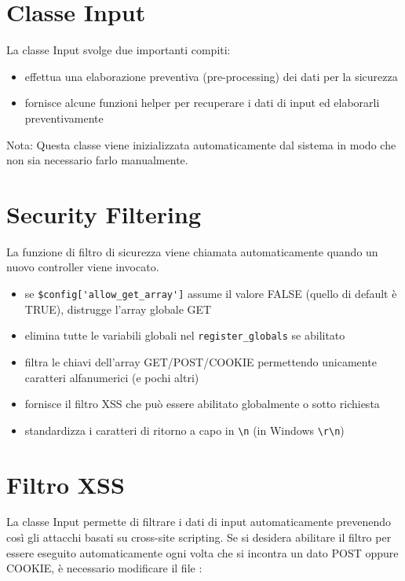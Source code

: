 \section{Classe Input}
\label{class:input}

La classe Input svolge due importanti compiti:

\begin{itemize}
\item effettua una elaborazione preventiva (pre-processing) dei dati per la sicurezza
\item fornisce alcune funzioni helper per recuperare i dati di input ed elaborarli preventivamente
\end{itemize}

Nota: Questa classe viene inizializzata automaticamente dal sistema in modo che non sia necessario farlo manualmente.

\section*{Security Filtering}
La funzione di filtro di sicurezza viene chiamata automaticamente quando un nuovo controller viene invocato. 

\begin{itemize}
\item se \verb|$config['allow_get_array']| assume il valore FALSE (quello di default è TRUE), distrugge l'array globale GET
\item elimina tutte le variabili globali nel \verb|register_globals| se abilitato
\item filtra le chiavi dell'array GET/POST/COOKIE permettendo unicamente caratteri alfanumerici (e pochi altri)
\item fornisce il filtro \ac{XSS} che può essere abilitato globalmente o sotto richiesta
\item standardizza i caratteri di ritorno a capo in \verb|\n| (in Windows \verb|\r\n|)
\end{itemize}

\section*{Filtro XSS}
La classe Input permette di filtrare i dati di input automaticamente prevenendo così gli attacchi basati su cross-site scripting. Se si desidera abilitare il filtro per essere eseguito automaticamente ogni volta che si incontra un dato POST oppure COOKIE, è necessario modificare il file :

